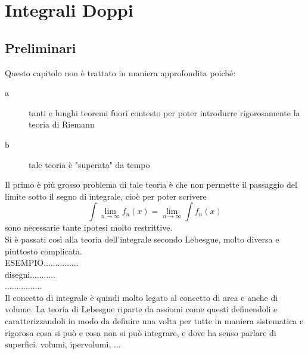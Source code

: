 \chapter{Integrali Doppi}
\section*{Preliminari}
Questo capitolo non è trattato in maniera approfondita poiché:
\begin{description}
	\item[a] tanti e lunghi teoremi fuori contesto per poter introdurre rigorosamente la teoria di Riemann
	\item[b] tale teoria è "superata" da tempo
\end{description}
Il primo è più grosso problema di tale teoria è che non permette il passaggio del limite sotto il segno di integrale, cioè per poter scrivere 
\[ \int\lim\limits_{n\to\infty}f_n(x) = \lim\limits_{n\to\infty}\int f_n(x)\] sono necessarie tante ipotesi molto restrittive.\\
Si è passati così alla teoria dell'integrale secondo Lebesgue, molto diversa e piuttosto complicata.\\
ESEMPIO...............\\
disegni...........\\
................\\
Il concetto di integrale è quindi molto legato al concetto di area e anche di volume. La teoria di Lebesgue riparte da assiomi come questi definendoli e caratterizzandoli in modo da definire una volta per tutte in maniera sistematica e rigorosa cosa si può e cosa non si può integrare, e dove ha senso parlare di superfici. volumi, ipervolumi, ... 
